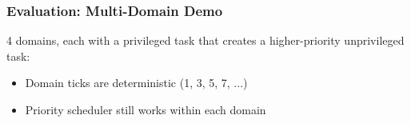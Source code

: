 \begin{frame}
\frametitle{Evaluation: Multi-Domain Demo}

4 domains, each with a privileged task that creates a higher-priority unprivileged task:

\vspace{0.2cm}
\begin{center}
\resizebox{0.9\textwidth}{!}{}
\end{center}

\vspace{0.2cm}
\begin{itemize}
  \item Domain ticks are deterministic (1, 3, 5, 7, ...)
  \item Priority scheduler still works within each domain
\end{itemize}

\end{frame}
